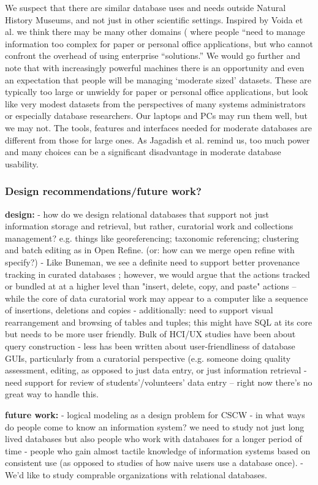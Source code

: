 We suspect that there are similar database uses and needs outside Natural History Museums, and not just in other scientific settings. Inspired by Voida et al. we think there may be  many other domains ( where people “need to manage information too complex for paper or personal office applications, but who cannot confront the overhead of using enterprise “solutions.” We would go further and note that with increasingly powerful machines there is an opportunity and even an expectation that people will be managing ‘moderate sized’ datasets. These are typically too large or unwieldy for paper or personal office applications, but look like very modest datasets from the perspectives of many systems administrators or especially database researchers. Our laptops and PCs may run them well, but we may not. The tools, features and interfaces needed for moderate databases are different from those for large ones. As Jagadish et al. remind us, too much power and many choices can be a significant disadvantage in moderate database usability.

\subsubsection{Design recommendations/future work?}

\textbf{design: }
- how do we design relational databases that support not just information storage and retrieval, but rather,  curatorial work and collections management? e.g. things like georeferencing; taxonomic referencing; clustering and batch editing as in Open Refine. (or: how can we merge open refine with specify?)
- Like Buneman, we see a definite need to support better provenance tracking in curated databases \cite{Buneman_2006}; however, we would argue that the actions tracked or bundled at at a higher level than "insert, delete, copy, and paste" actions -- while the core of data curatorial work may appear to a computer like a sequence of insertions, deletions and copies
- additionally: need to support visual rearrangement and browsing of tables and tuples; this might have SQL at its core but needs to be more user friendly. Bulk of HCI/UX studies have been about query construction - less has been written about user-friendliness of database GUIs, particularly from a curatorial perspective (e.g. someone doing quality assessment, editing, as opposed to just data entry, or just information retrieval
- need support for review of students'/volunteers' data entry  -- right now there's no great way to handle this.

\textbf{future work:}
- logical modeling as a design problem for CSCW
- in what ways do people come to know an information system? we need to study not just long lived databases but also people who work with databases for a longer period of time - people who gain almost tactile knowledge of information systems based on consistent use (as opposed to studies of how naive users use a database once).
- We'd like to study comprable organizations with relational databases.